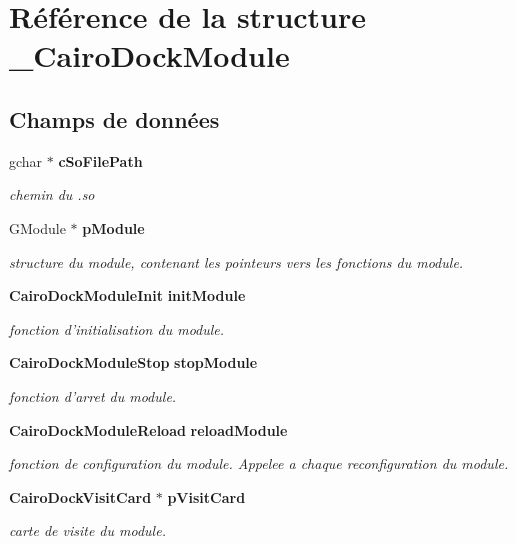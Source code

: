 \section{Référence de la structure \_\-CairoDockModule}
\label{struct__CairoDockModule}
\subsection*{Champs de données}
\begin{CompactItemize}
\item 
gchar $\ast$ {\bf cSoFilePath}
\begin{CompactList}\small\item\em chemin du .so \item\end{CompactList}\item 
GModule $\ast$ {\bf pModule}
\begin{CompactList}\small\item\em structure du module, contenant les pointeurs vers les fonctions du module. \item\end{CompactList}\item 
{\bf CairoDockModuleInit} {\bf initModule}
\begin{CompactList}\small\item\em fonction d'initialisation du module. \item\end{CompactList}\item 
{\bf CairoDockModuleStop} {\bf stopModule}
\begin{CompactList}\small\item\em fonction d'arret du module. \item\end{CompactList}\item 
{\bf CairoDockModuleReload} {\bf reloadModule}
\begin{CompactList}\small\item\em fonction de configuration du module. Appelee a chaque reconfiguration du module. \item\end{CompactList}\item 
{\bf CairoDockVisitCard} $\ast$ {\bf pVisitCard}
\begin{CompactList}\small\item\em carte de visite du module. \item\end{CompactList}\item 

\end{CompactItemize}

